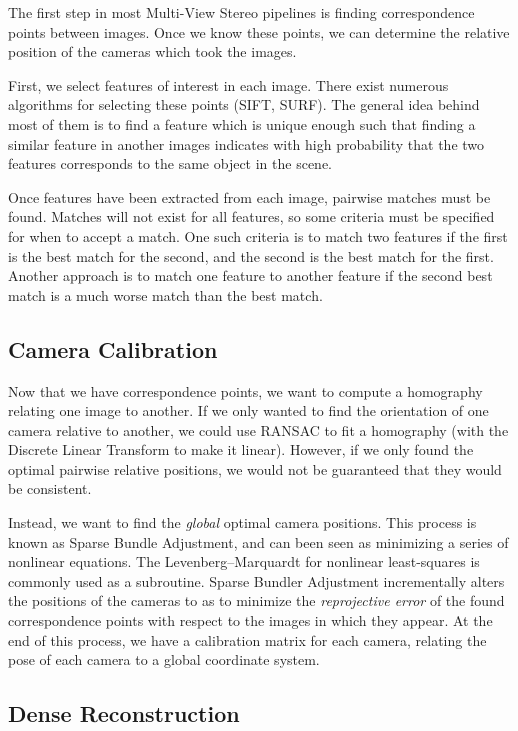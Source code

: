 \documentclass[10pt,twocolumn,letterpaper]{article}
\begin{document}
The first step in most Multi-View Stereo pipelines is finding correspondence points between images. Once we know these points, we can determine the relative position of the cameras which took the images. 

First, we select features of interest in each image. There exist numerous algorithms for selecting these points (SIFT, SURF). The general idea behind most of them is to find a feature which is unique enough such that finding a similar feature in another images indicates with high probability that the two features corresponds to the same object in the scene.\cite{brown}

Once features have been extracted from each image, pairwise matches must be found. Matches will not exist for all features, so some criteria must be specified for when to accept a match. One such criteria is to match two features if the first is the best match for the second, and the second is the best match for the first. Another approach is to match one feature to another feature if the second best match is a much worse match than the best match.\cite{brown}

\subsection{Camera Calibration}

Now that we have correspondence points, we want to compute a homography relating one image to another. If we only wanted to find the orientation of one camera relative to another, we could use RANSAC to fit a homography (with the Discrete Linear Transform to make it linear).\cite{ransac} However, if we only found the optimal pairwise relative positions, we would not be guaranteed that they would be consistent.

Instead, we want to find the \emph{global} optimal camera positions. This process is known as Sparse Bundle Adjustment, and can been seen as minimizing a series of nonlinear equations. The  Levenberg–Marquardt for nonlinear least-squares is commonly used as a subroutine. Sparse Bundler Adjustment incrementally alters the positions of the cameras to as to minimize the \emph{reprojective error} of the found correspondence points with respect to the images in which they appear. At the end of this process, we have a calibration matrix for each camera, relating the pose of each camera to a global coordinate system.\cite{snavely, sba}

\subsection{Dense Reconstruction}
\end{document}
